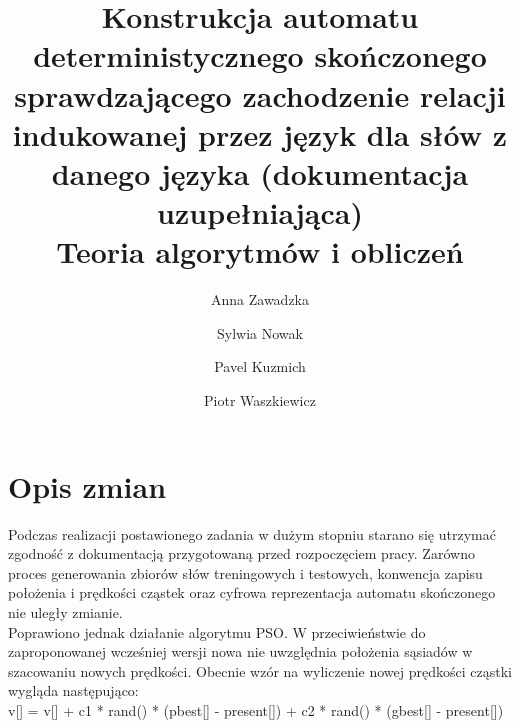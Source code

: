 \documentclass[runningheads,a4paper]{llncs}
\begin{document}
\vspace{-100pt}
\mainmatter  %
\title{Konstrukcja automatu deterministycznego skończonego sprawdzającego zachodzenie relacji indukowanej przez język dla słów z danego języka (dokumentacja uzupełniająca)\\Teoria algorytmów i obliczeń}


%
%
\author{Anna Zawadzka\and Sylwia Nowak\and Pavel Kuzmich\and Piotr Waszkiewicz}
%
\authorrunning{}

%
%

\maketitle

\section{Opis zmian}

Podczas realizacji postawionego zadania w dużym stopniu starano się utrzymać zgodność z dokumentacją przygotowaną przed rozpoczęciem pracy. Zarówno proces generowania zbiorów słów treningowych i testowych, konwencja zapisu położenia i prędkości cząstek oraz cyfrowa reprezentacja automatu skończonego nie uległy zmianie. \\

Poprawiono jednak działanie algorytmu PSO. W przeciwieństwie do zaproponowanej wcześniej wersji nowa nie uwzględnia położenia sąsiadów w szacowaniu nowych prędkości. Obecnie wzór na wyliczenie nowej prędkości cząstki wygląda następująco: \\

v[] = v[] + c1 * rand() * (pbest[] - present[]) + c2 * rand() * (gbest[] - present[]) \\
\end{document}
